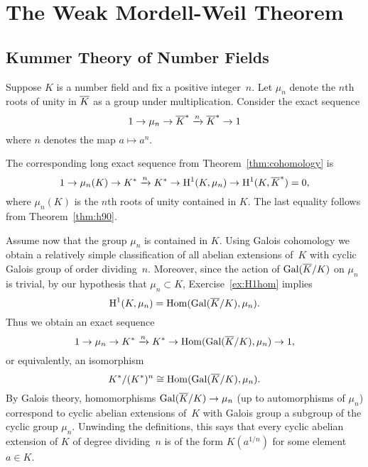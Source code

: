 \chapter{The Weak Mordell-Weil Theorem}\label{ch:weakmw}

\section{Kummer Theory of Number Fields}\label{sec:kummernf}

Suppose $K$ is a number field and fix a positive integer~$n$.
Let $\mu_n$ denote the $n$th roots of unity in $\overline{K}$ as a group
under multiplication. Consider the exact sequence
$$
	1 \to \mu_n \to \overline{K}^* \xrightarrow{n} \overline{K}^* \to 1
$$
where $n$ denotes the map $a\mapsto a^n$.

The corresponding long exact sequence from Theorem~\ref{thm:cohomology}
is
$$
	1 \to \mu_n(K) \to K^* \xrightarrow{n} K^*
	\to \operatorname{H}^1(K,\mu_n) \to \operatorname{H}^1(K,\overline{K}^*) =0,
$$
where $\mu_n(K)$ is the $n$th roots of unity contained in $K$.
The last equality follows from Theorem~\ref{thm:h90}.

Assume now that the group $\mu_n$ is contained in $K$.
Using Galois cohomology we obtain a relatively simple classification
of all abelian extensions of~$K$ with cyclic Galois group of order
dividing~$n$. Moreover, since the action of $\operatorname{Gal}(\overline{K}/K)$ on
$\mu_n$ is trivial, by our hypothesis that $\mu_n\subset K$,
Exercise~\ref{ex:H1hom} implies
$$
	\operatorname{H}^1(K,\mu_n) = \operatorname{Hom}(\operatorname{Gal}(\overline{K}/K),\mu_n).
$$
Thus we obtain an exact sequence
$$
	1 \to \mu_n \to K^* \xrightarrow{n} K^*
	\to \operatorname{Hom}(\operatorname{Gal}(\overline{K}/K),\mu_n) \to 1,
$$
or equivalently, an isomorphism
$$
	K^*/(K^*)^n \cong \operatorname{Hom}(\operatorname{Gal}(\overline{K}/K),\mu_n).
$$
By Galois theory, homomorphisms $\operatorname{Gal}(\overline{K}/K)\to \mu_n$ (up to
automorphisms of $\mu_n$) correspond to cyclic abelian extensions
of~$K$ with Galois group a subgroup of the cyclic group $\mu_n$.
Unwinding the definitions, this says that every
cyclic abelian extension of $K$ of degree dividing~$n$ is of the form
$K(a^{1/n})$ for some element $a\in K$.

